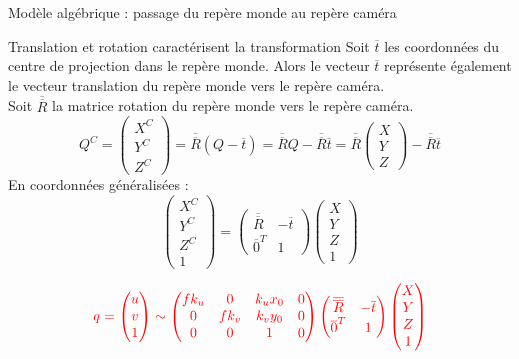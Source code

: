 \documentclass[8pt]{beamer}
\begin{document}
	\begin{frame}{Modèle algébrique : passage du repère monde au repère caméra}
		\begin{block}{Translation et rotation caractérisent la transformation}
			Soit $\overline{t}$ les coordonnées du centre de projection dans le repère monde. Alors le vecteur $\overline{t}$ représente également le vecteur translation du repère monde vers le repère caméra.\\
			Soit $\overline{\overline{R}}$ la matrice rotation du repère monde vers le repère caméra.
			$$
			Q^C = \begin{pmatrix}
			X^C\\Y^C\\Z^C
			\end{pmatrix} = \overline{\overline{R}}\left( Q - \overline{t} \right) =
			\overline{\overline{R}}Q - \overline{\overline{R}}\overline{t} =
			\overline{\overline{R}}\begin{pmatrix}X\\Y\\Z\end{pmatrix} - \overline{\overline{R}}\overline{t}
			$$
			En coordonnées généralisées :
			$$
			\begin{pmatrix}
			X^C\\Y^C\\Z^C\\1
			\end{pmatrix} = \begin{pmatrix}
			\overline{\overline{R}} & -\overline{t}\\\overline{0}^T & 1
			\end{pmatrix}\begin{pmatrix}
			X\\Y\\Z\\1
			\end{pmatrix}
			$$
		\end{block}
		$${\color{red}
			q = \begin{pmatrix}
			u\\v\\1
			\end{pmatrix} \sim \begin{pmatrix}
			fk_u & 0 & k_ux_0 & 0\\0 & fk_v & k_vy_0 & 0\\0 & 0 & 1 & 0
			\end{pmatrix}\begin{pmatrix}
			\overline{\overline{R}} & -\overline{t}\\\overline{0}^T & 1
			\end{pmatrix}\begin{pmatrix}
			X\\Y\\Z\\1
			\end{pmatrix}
		}$$
	\end{frame}
\end{document}
